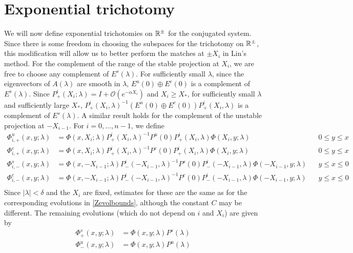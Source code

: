 \documentclass[thesis.tex]{subfiles}
\begin{document}
\section{Exponential trichotomy}\label{sec:trichotomy}

We will now define exponential trichotomies on $\mathbb{R}^\pm$ for the conjugated system. Since there is some freedom in choosing the subspaces for the trichotomy on $\mathbb{R}^\pm$, this modification will allow us to better perform the matches at $\pm X_i$ in Lin's method. For the complement of the range of the stable projection at $X_i$, we are free to choose any complement of $E^s(\lambda)$. For sufficiently small $\lambda$, since the eigenvectors of $A(\lambda)$ are smooth in $\lambda$, $E^u(0)\oplus E^c(0)$ is a complement of $E^s(\lambda)$. Since $P^i_+(X_i; \lambda) = I + \mathcal{O}(e^{-\alpha X_i})$ and $X_i \geq X_*$, for sufficiently small $\lambda$ and sufficiently large $X_*$, $P^i_+(X_i, \lambda)^{-1} ( E^u(0)\oplus E^c(0) ) P^i_+(X_i, \lambda)$ is a complement of $E^s(\lambda)$. A similar result holds for the complement of the unstable projection at $-X_{i-1}$. For $i = 0, \dots, n-1$, we define
\begin{equation}\label{Zevolmod}
\begin{aligned}
\Phi^u_{i,+}(x, y; \lambda) &= \Phi(x, X_i; \lambda) P^i_+(X_i, \lambda)^{-1}
P^u(0) P^i_+(X_i, \lambda) \Phi(X_i, y; \lambda) && 0 \leq y \leq x \\
\Phi^c_{i,+}(x, y; \lambda) &= \Phi(x, X_i; \lambda) P^i_+(X_i, \lambda)^{-1}
P^c(0) P^i_+(X_i, \lambda) \Phi(X_i, y; \lambda) && 0 \leq y \leq x \\
\Phi^s_{i,-}(x, y; \lambda) &= \Phi(x, -X_{i-1}; \lambda) P^i_-(-X_{i-1}, \lambda)^{-1}
P^s(0) P^i_-(-X_{i-1}, \lambda) \Phi(-X_{i-1}, y; \lambda) && y \leq x \leq 0 \\
\Phi^c_{i,-}(x, y; \lambda) &= \Phi(x, -X_{i-1}; \lambda) P^i_-(-X_{i-1}, \lambda)^{-1}
P^c(0) P^i_-(-X_{i-1}, \lambda) \Phi(-X_{i-1}, y; \lambda) && y \leq x \leq 0 \\
\end{aligned}
\end{equation}
Since $|\lambda| < \delta$ and the $X_i$ are fixed, estimates for these are the same as for the corresponding evolutions in \cref{Zevolbounds}, although the constant $C$ may be different. The remaining evolutions (which do not depend on $i$ and $X_i$) are given by
\begin{equation}\label{Zevolrest}
\begin{aligned}
\Phi^s_+(x, y; \lambda) &= \Phi(x, y; \lambda) P^s(\lambda) \\
\Phi^u_-(x, y; \lambda) &= \Phi(x, y; \lambda) P^u(\lambda)
\end{aligned}
\end{equation}
\end{document}
